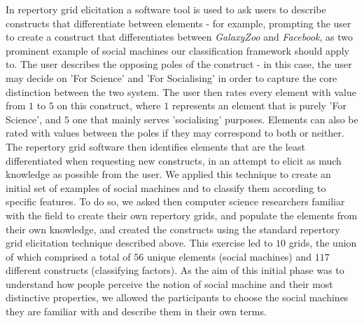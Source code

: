 \documentclass{sig-alternate}
\begin{document}
In repertory grid elicitation a software tool is used to ask users to describe constructs
that differentiate between elements - for example,  prompting the user to create a construct that
differentiates between {\it GalaxyZoo} and {\it Facebook}, as two prominent example of social machines our classification framework should apply to. The user describes the opposing poles of the construct - in this case, the user may decide on 'For Science' and 'For Socialising' in order to capture the core distinction between the two system. The user then rates every element with value from $1$ to $5$ on this construct, where $1$ represents an element that is purely
'For Science', and $5$ one that mainly serves  'socialising' purposes. Elements can also be rated with values between the poles if they may correspond to both or neither. The repertory grid software then identifies elements that are the least differentiated when requesting new constructs, in an attempt to elicit as much knowledge as possible from the user. We applied this technique to create an initial set of examples of social machines and to classify them according to specific features. To do so, we asked then computer science researchers familiar with the field to create their own repertory grids, and populate the elements from their own knowledge, and created the constructs using the standard repertory grid elicitation technique described above. This exercise led to $10$ grids, the union of which comprised a total of $56$ unique elements (social machines)
and $117$ different constructs (classifying factors). As the aim of this initial phase was to understand how people perceive the notion of social machine and their most distinctive properties, we allowed the participants to choose the social machines they are familiar with and describe them in their own terms.

\end{document}
